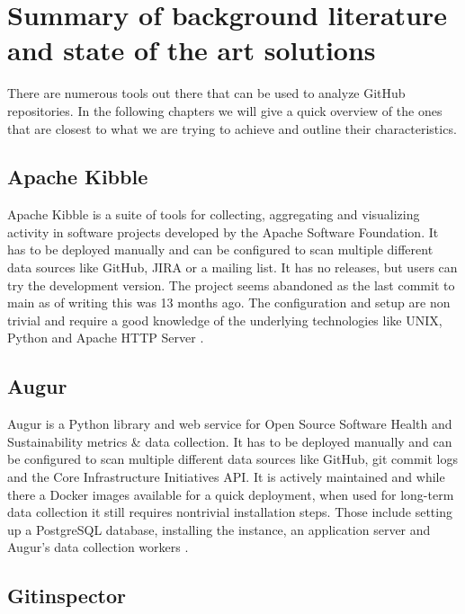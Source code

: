 \documentclass[authoryear,preprint,review,12pt]{elsarticle}
\begin{document}
\section{Summary of background literature and state of the art solutions}
\label{sec:summary}

There are numerous tools out there that can be used to analyze GitHub repositories. In the
following chapters we will give a quick overview of the ones that are closest to what we are trying
to achieve and outline their characteristics.

\subsection{Apache Kibble}
\label{sec:summary:kibble}

Apache Kibble is a suite of tools for collecting, aggregating and visualizing activity in software
projects developed by the Apache Software Foundation. It has to be deployed manually and can be
configured to scan multiple different data sources like GitHub, JIRA or a mailing list. It has no
releases, but users can try the development version. The project seems abandoned as the last commit
to main as of writing this was 13 months ago. The configuration and setup are non trivial and
require a good knowledge of the underlying technologies like UNIX, Python and Apache HTTP Server
\citep{ApacheKibble2022}.

\subsection{Augur}
\label{sec:summary:augur}

Augur is a Python library and web service for Open Source Software Health and Sustainability
metrics \& data collection. It has to be deployed manually and can be configured to scan multiple
different data sources like GitHub, git commit logs and the Core Infrastructure Initiatives API. It
is actively maintained and while there a Docker images available for a quick deployment, when used
for long-term data collection it still requires nontrivial installation steps. Those include
setting up a PostgreSQL database, installing the instance, an application server and Augur's data
collection workers \citep{Augur2022}.

\subsection{Gitinspector}
\label{sec:summary:gitinspector}
\end{document}
